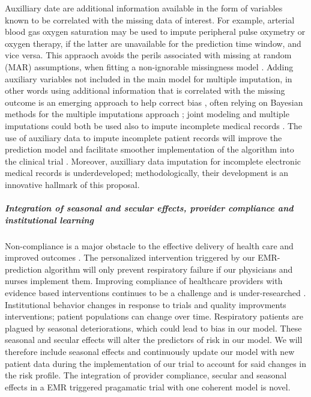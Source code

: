 \documentclass[]{article}
\begin{document}
Auxilliary date are additional information available in the form of
variables known to be correlated with the missing data of interest. For
example, arterial blood gas oxygen saturation may be used to impute
peripheral pulse oxymetry or oxygen therapy, if the latter are
unavailable for the prediction time window, and vice versa. This
appraoch avoids the perils associated with missing at random (MAR)
assumptions, when fitting a non-ignorable missingness model
\cite{Wang_20029935}. Adding auxiliary variables not included in the
main model for multiple imputation, in other words using additional
information that is correlated with the missing outcome is an emerging
approach to help correct bias
\cite{Meng_1994; @Collins_11778676; @Rubin_1996}, often relying on
Bayesian methods for the multiple imputations approach
\cite{Daniels_2008; @Schafer_1997}; joint modeling and multiple
imputations could both be used also to impute incomplete medical records
\cite{Fitzmaurice_2008}. The use of auxiliary data to impute incomplete
patient records will improve the prediction model and facilitate
smoother implementation of the algorithm into the clinical trial
\cite{Hall_25389642}. Moreover, auxilliary data imputation for
incomplete electronic medical records is underdeveloped;
methodologically, their development is an innovative hallmark of this
proposal.

\subparagraph{Integration of seasonal and secular effects, provider
compliance and institutional
learning}\label{integration-of-seasonal-and-secular-effects-provider-compliance-and-institutional-learning}

Non-compliance is a major obstacle to the effective delivery of health
care and improved outcomes \cite{Duncan_16710766}. The personalized
intervention triggered by our EMR-prediction algorithm will only prevent
respiratory failure if our physicians and nurses implement them.
Improving compliance of healthcare providers with evidence based
interventions continues to be a challenge and is under-researched
\cite{Davis_7650822}. Institutional behavior changes in response to
trials and quality improvments interventions; patient populations can
change over time. Respiratory patients are plagued by seasonal
deteriorations, which could lead to bias in our model. These seasonal
and secular effects will alter the predictors of risk in our model. We
will therefore include seasonal effects and continuously update our
model with new patient data during the implementation of our trial to
account for said changes in the risk profile. The integration of
provider compliance, secular and seasonal effects in a EMR triggered
pragamatic trial with one coherent model is novel.
\end{document}
